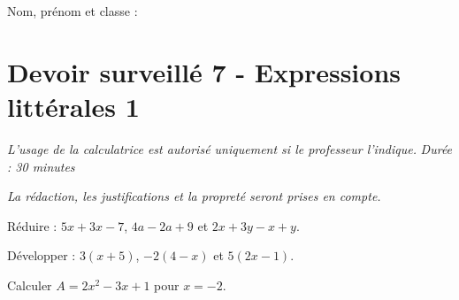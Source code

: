 \documentclass[a4paper,10pt]{report}
\begin{document}
\pagestyle{empty}
\noindent Nom, prénom et classe : \dotfill

\section*{Devoir surveillé 7 - Expressions littérales 1}

\noindent \textit{L'usage de la calculatrice est autorisé uniquement si le professeur l'indique.} \hfill \textit{Durée : 30 minutes}

\medskip
\noindent \textit{La rédaction, les justifications et la propreté seront prises en compte.}


\begin{ex}[Réduire]
Réduire : $5x+3x-7$, $4a-2a+9$ et $2x+3y-x+y$.
\medskip\noindent\grandscarreaux{\linewidth}{3cm}
\end{ex}
\begin{ex}[Développer]
Développer : $3(x+5)$, $-2(4-x)$ et $5(2x-1)$.
\medskip\noindent\grandscarreaux{\linewidth}{4cm}
\end{ex}
\begin{ex}[Substituer]
Calculer $A=2x^2-3x+1$ pour $x=-2$.
\medskip\noindent\grandscarreaux{\linewidth}{3cm}
\end{ex}
\end{document}
